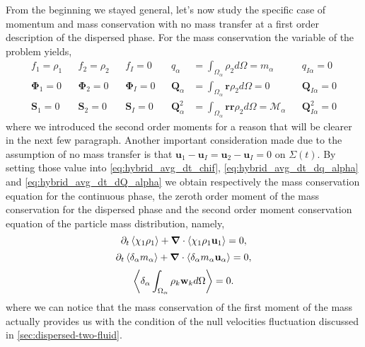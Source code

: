 From the beginning we stayed general, let's now study the specific case of momentum and mass conservation with no mass transfer at a first order description of the dispersed phase. 
For the mass conservation the variable of the problem yields,
\begin{align*}
    f_1 = \rho_1           
    && f_2 =  \rho_2    
    && f_I =  0
    && q_\alpha &= \int_{\Omega_\alpha} \rho_2  d\Omega = m_\alpha
    && q_{I\alpha} = 0\\
    \mathbf{\Phi}_1 = 0    
    &&     \mathbf{\Phi}_2  =  0         
    &&     \mathbf{\Phi}_I  =  0         
    && \textbf{Q}_\alpha &= \int_{\Omega_\alpha} \textbf{r} \rho_2  d\Omega = 0
    && \textbf{Q}_{I\alpha} = 0\\
    \textbf{S}_1 = 0       
    &&      \textbf{S}_2    =  0         
    &&      \textbf{S}_I    =  0         
    && \textbf{Q}^2_\alpha &= \int_{\Omega_\alpha} \textbf{rr} \rho_2  d\Omega = \mathcal{M}_\alpha
    && \textbf{Q}^2_{I\alpha} = 0
\end{align*} 
where we introduced the second order moments for a reason that will be clearer in the next few paragraph. 
Another important consideration made due to the assumption of no mass transfer is that $\textbf{u}_1 - \textbf{u}_I =\textbf{u}_2 - \textbf{u}_I  =0 $ on $\Sigma(t)$.
By setting those value into \ref{eq:hybrid_avg_dt_chif}, \ref{eq:hybrid_avg_dt_dq_alpha} and \ref{eq:hybrid_avg_dt_dQ_alpha} we obtain respectively the mass conservation equation for the continuous phase, the  zeroth order moment of the mass conservation for the dispersed phase and the second order moment conservation equation of the particle mass distribution, namely,
\begin{equation}
    \partial_t \left<\chi_1 \rho_1\right>
    + \bm{\nabla} \cdot \left<\chi_1 \rho_1 \textbf{u}_1\right>
    = 0,
    \label{eq:hybrid_avg_dt_chi_m}
\end{equation}
\begin{equation}
    \partial_t \left<\delta_\alpha  m_\alpha\right>
    + \bm{\nabla} \cdot\left<\delta_\alpha  m_\alpha \textbf{u}_\alpha\right>
    = 0,
    \label{eq:hybrid_avg_dt_dm_alpha}
\end{equation}
\begin{equation}
    \left<\delta_\alpha \int_{\Omega_\alpha} 
        \rho_k\textbf{w}_k
         d\Omega\right>
    = 0.
    \label{eq:hybrid_avg_dt_dM_alpha}\\
\end{equation}
where we can notice that the mass conservation of the first moment of the mass actually provides us with the condition of the null velocities fluctuation discussed in \ref{sec:dispersed-two-fluid}.

